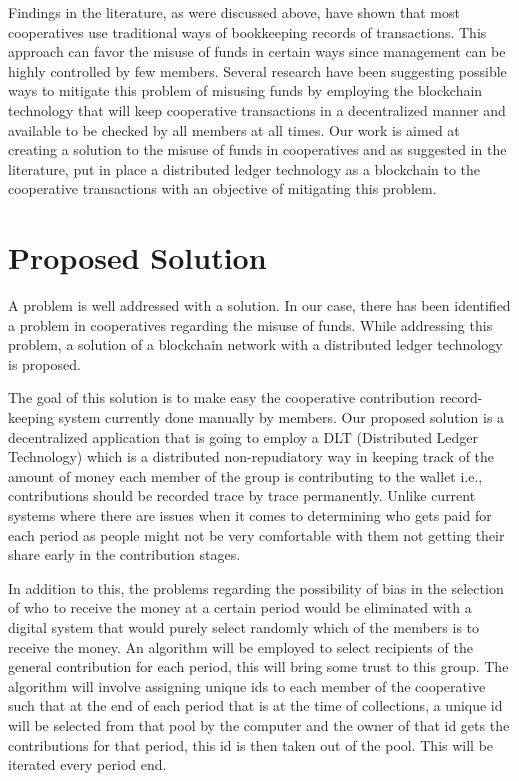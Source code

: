 \documentclass{article}
\begin{document}
\begin{flushleft}
Findings in the literature, as were discussed above, have shown that most cooperatives use traditional ways of bookkeeping records of transactions. This approach can favor the misuse of funds in certain ways since management can be highly controlled by few members. \cite{rca001, nair2018blockchain, un_issues} Several research have been suggesting possible ways to mitigate this problem of misusing funds by employing the blockchain technology that will keep cooperative transactions in a decentralized manner and available to be checked by all members at all times. \cite{mannan2018fostering, mitch_national, ieee_s8637578, alma991019580288704436, proquest2282979983} Our work is aimed at creating a solution to the misuse of funds in cooperatives and as suggested in the literature, put in place a distributed ledger technology as a blockchain to the cooperative transactions with an objective of mitigating this problem.

\section{Proposed Solution}
A problem is well addressed with a solution. In our case, there has been identified a problem in cooperatives regarding the misuse of funds. While addressing this problem, a solution of a blockchain network with a distributed ledger technology is proposed.

The goal of this solution is to make easy the cooperative contribution record-keeping system currently done manually by members. Our proposed solution is a decentralized application that is going to employ a DLT (Distributed Ledger Technology) which is a distributed non-repudiatory way in keeping track of the amount of money each member of the group is contributing to the wallet i.e., contributions should be recorded trace by trace permanently. Unlike current systems where there are issues when it comes to determining who gets paid for each period as people might not be very comfortable with them not getting their share early in the contribution stages. 

In addition to this, the problems regarding the possibility of bias in the selection of who to receive the money at a certain period would be eliminated with a digital system that would purely select randomly which of the members is to receive the money. An algorithm will be employed to select recipients of the general contribution for each period, this will bring some trust to this group. The algorithm will involve assigning unique ids to each member of the cooperative such that at the end of each period that is at the time of collections, a unique id will be selected from that pool by the computer and the owner of that id gets the contributions for that period, this id is then taken out of the pool. This will be iterated every period end.


\end{flushleft}
\end{document}
